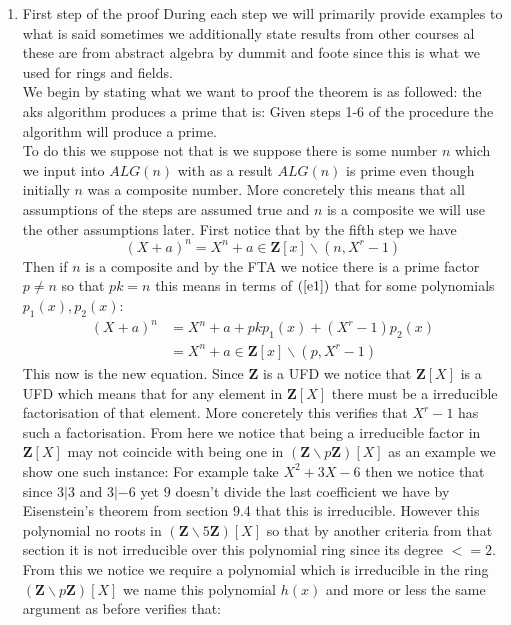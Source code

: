 \documentclass[../Main.tex]{subfiles}
\begin{document}
\begin{enumerate}

\item First step of the proof 
During each step we will primarily provide examples to what is said sometimes we additionally state results from other courses al these are from abstract algebra by dummit and foote since this is what we used for rings and fields. \\
We begin by stating what we want to proof the theorem is as followed: the aks algorithm produces a prime that is: Given steps 1-6 of the procedure the algorithm will produce a prime. \\ 
To do this  we suppose not that is we suppose there is some number $n$ which we input into $ALG(n)$ with as a result $ALG(n)$ is prime even though initially $n$ was a composite number.  More concretely this means that all assumptions of the steps are assumed true and $n$ is a composite we will use the other assumptions later. First notice that by the fifth step we have 
\begin{equation}
    (X+a)^n = X^n+a \in \mathbf{Z}[x]\backslash(n,X^r-1)
    \label{e1}
\end{equation}
Then if $n$ is a composite and by the FTA we notice there is a prime factor $p\neq n$ so that $pk=n$ this means in terms of $(\ref{e1})$ that for some polynomials $p_1(x),p_2(x)$:
\begin{equation}
    \begin{split}
        (X+a)^n &= X^n+a+pkp_1(x)+(X^r-1)p_2(x)\\
                &= X^n+a\in \mathbf{Z}[x]\backslash(p,X^r-1)
                \label{e2}
    \end{split}
\end{equation}
This now is the new equation. Since $\mathbf{Z}$ is a UFD we notice that $\mathbf{Z}[X]$ is a UFD which means that for any element in $\mathbf{Z}[X]$ there must be a irreducible factorisation of that element. More concretely this verifies that $X^r-1$ has such a factorisation. From here we notice that being a irreducible factor in $\mathbf{Z}[X]$ may not coincide with being one in $(\mathbf{Z}\backslash p\mathbf{Z})[X]$ as an example we show one such instance: For example take $X^2+3X-6$ then we notice that since $3|3$ and $3|-6$ yet $9$ doesn't divide the last coefficient we have by Eisenstein's theorem from section 9.4 that this is irreducible. However this polynomial no roots in $(\mathbf{Z}\backslash 5\mathbf{Z})[X]$ so that by another criteria from that section it is not irreducible over this polynomial ring since its degree $<=2$. From this we notice we require a polynomial which is irreducible in the ring $(\mathbf{Z}\backslash p\mathbf{Z})[X]$ we name this polynomial $h(x)$ and more or less the same argument as before verifies that:

\end{enumerate}
\end{document}
